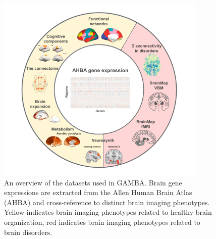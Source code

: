 \begin{refsection}
\begin{figure}[h]
    \centering
    \includegraphics[width=10cm]{images/gambaFig1.png}
    \caption{An overview of the datasets used in GAMBA. Brain gene expressions are extracted from the Allen Human Brain Atlas (AHBA) and cross-reference to distinct brain imaging phenotypes. Yellow indicates brain imaging phenotypes related to healthy brain organization, red indicates brain imaging phenotypes related to brain disorders.}
    \label{gambaFig1}
\end{figure}


\end{refsection}
